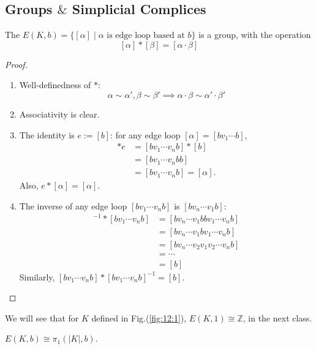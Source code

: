 \subsection{Groups $\&$ Simplicial Complices}
\begin{proposition}
The $E(K,b) = \{[\alpha]\mid\text{$\alpha$ is edge loop based at $b$}\}$ is a group, with the operation
\[
[\alpha]*[\beta] = [\alpha\cdot\beta]
\]
\end{proposition}
\begin{proof}
\begin{enumerate}
\item
Well-definedness of $*$:
\[
\alpha\sim\alpha',\beta\sim\beta'\implies
\alpha\cdot\beta\sim\alpha'\cdot\beta'
\]
\item
Associativity is clear.
\item
The identity is $e:=[b]$: for any edge loop $[\alpha]=[bv_1\cdots b]$,
\begin{align*}
[\alpha]*e&=[bv_1\cdots v_nb]*[b]\\
&=[bv_1\cdots v_nbb]\\
&=[bv_1\cdots v_nb] = [\alpha].
\end{align*}
Also, $e*[\alpha] = [\alpha]$.
\item
The inverse of any edge loop $[bv_1\cdots v_nb]$ is $[bv_n\cdots v_1b]$:
\begin{align*}
[bv_1\cdots v_nb]^{-1}*[bv_1\cdots v_nb]
&=[bv_n\cdots v_1bbv_1\cdots v_nb]\\
&=[bv_n\cdots v_1bv_1\cdots v_nb]\\
&=[bv_n\cdots v_2v_1v_2\cdots v_nb]\\
&=\cdots\\
&=[b]
\end{align*}
Similarly, $[bv_1\cdots v_nb]*[bv_1\cdots v_nb]^{-1}=[b]$.
\end{enumerate}
\end{proof}

We will see that for $K$ defined in Fig.(\ref{fig:12:1}), $E(K,1)\cong\mathbb{Z}$, in the next class.

\begin{theorem}
$E(K,b)\cong\pi_1(|K|,b)$.
\end{theorem}

